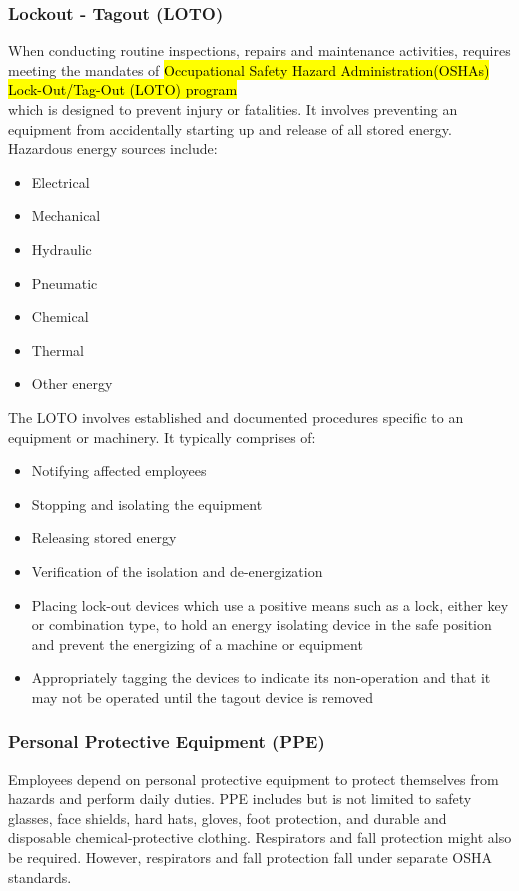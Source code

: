\subsubsection{Lockout - Tagout (LOTO)}

When conducting routine inspections, repairs and maintenance activities, requires meeting the mandates of \hl{Occupational Safety  Hazard Administration(OSHAs) Lock-Out/Tag-Out (LOTO) program}\\
which is designed to prevent injury or fatalities.  It involves preventing an equipment from accidentally starting up and release of all stored energy.  Hazardous energy sources include: 
\begin{itemize}
\item Electrical 
\item Mechanical
\item Hydraulic
\item Pneumatic 
\item Chemical 
\item Thermal  
\item Other energy
\end{itemize}

The LOTO involves established and documented procedures specific to an equipment or machinery.  It typically comprises of:\\
\begin{itemize}
\item Notifying affected employees
\item Stopping and isolating the equipment
\item Releasing stored energy
\item Verification of the isolation and de-energization
\item Placing lock-out devices which use a positive means such as a lock, either key or combination type, to hold an energy isolating device in the safe position and prevent the energizing of a machine or equipment
\item Appropriately tagging the devices to indicate its non-operation and that it may not be operated until the tagout device is removed
\end{itemize}

\subsubsection{Personal Protective Equipment (PPE)}
Employees depend on personal protective equipment to protect themselves from hazards and perform daily duties. PPE includes but is not limited to safety glasses, face shields, hard hats, gloves, foot protection, and durable and disposable chemical-protective clothing. Respirators and fall protection might also be required. However, respirators and fall protection fall under separate OSHA standards. \\


